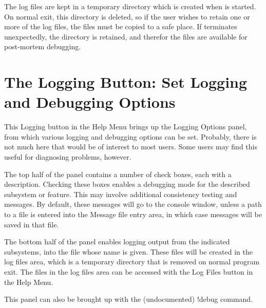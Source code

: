 The log files are kept in a temporary directory which is created when
{\Xic} is started.  On normal exit, this directory is deleted, so if
the user wishes to retain one or more of the log files, the files must
be copied to a safe place.  If {\Xic} terminates unexpectedly, the
directory is retained, and therefor the files are available for
post-mortem debugging.


\section{The {\cb Logging} Button: Set Logging and Debugging Options}
This {\cb Logging} button in the {\cb Help Menu} brings up the {\cb
Logging Options} panel, from which various logging and debugging
options can be set.  Probably, there is not much here that would be of
interest to most users.  Some users may find this useful for
diagnosing problems, however.

The top half of the panel contains a number of check boxes, each with
a description.  Checking these boxes enables a debugging mode for the
described subsystem or feature.  This may involve additional
consistency testing and messages.  By default, these messages will go
to the console window, unless a path to a file is entered into the
{\cb Message file} entry area, in which case messages will be saved in
that file.
 
The bottom half of the panel enables logging output from the indicated
subsystems, into the file whose name is given.  These files will be
created in the log files area, which is a temporary directory that is
removed on normal program exit.  The files in the log files area can
be accessed with the {\cb Log Files} button in the {\cb Help Menu}.
 
This panel can also be brought up with the (undocumented) {\cb !debug}
command.

